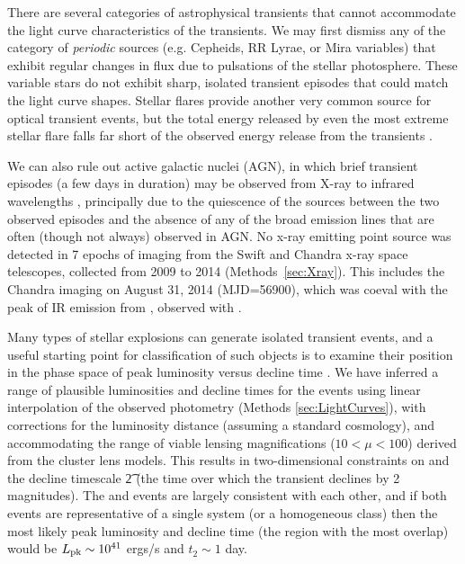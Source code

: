 There are several categories of
astrophysical transients that cannot accommodate the light curve
characteristics of the \spock transients.  We may first dismiss any of
the category of {\it periodic} sources (e.g. Cepheids, RR Lyrae, or
Mira variables) that exhibit regular changes in flux due to pulsations
of the stellar photosphere. These variable stars do not exhibit sharp,
isolated transient episodes that could match the \spock light curve
shapes. Stellar flares provide another very common source for optical
transient events, but the total energy released by even the most
extreme stellar flare falls far short of the observed energy release
from the \spock transients \citep{Balona:2012,Karoff:2016} .

We can also rule out active galactic nuclei (AGN), in which
brief transient episodes (a few days in duration) may be observed from
X-ray to infrared wavelengths \citep[e.g.][]{Gaskell:2003},
principally due to the quiescence of the \spock sources between the
two observed episodes and the absence of any of the broad emission
lines that are often (though not always) observed in AGN.  No x-ray
emitting point source was detected in 7 epochs of imaging from
the Swift and Chandra x-ray space telescopes, collected from 2009 to
2014 (Methods~\ref{sec:Xray}).  This includes the Chandra imaging on
August 31, 2014 (MJD=56900), which was coeval with the peak
of IR emission from \spocktwo, observed with \HST.

Many types of stellar explosions can generate isolated
transient events, and a useful starting point for classification of
such objects is to examine their position in the phase
space of peak luminosity versus decline time \citep[see,
  e.g.,][]{Kulkarni:2007}. We have inferred a range of plausible
luminosities and decline times for the \spock events using linear
interpolation of the observed photometry (Methods
\ref{sec:LightCurves}), with corrections for the luminosity distance
(assuming a standard \LCDM cosmology), and accommodating the range of
viable lensing magnifications ($10<\mu<100$) derived from the cluster
lens models. This results in two-dimensional constraints on \Lpk and
the decline timescale \t2 (the time over which the transient declines
by 2 magnitudes). The \spockone and \spocktwo events are largely
consistent with each other, and if both events are representative of a
single system (or a homogeneous class) then the most likely peak
luminosity and decline time (the region with the most overlap) would
be $L_{\rm pk}\sim10^{41}$ ergs/s and $t_2\sim1$ day.


